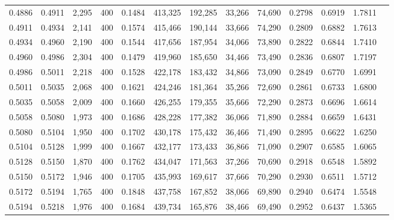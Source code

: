 \begin{tabular}{rrrrrrrrrrrrr}
0.4886 & 0.4911 &  2,295 & 400 &                                     0.1484 & 413,325 & 192,285 &  33,266 &  74,690 & 0.2798 & 0.6919 & 1.7811 \\
0.4911 & 0.4934 &  2,141 & 400 &                                     0.1574 & 415,466 & 190,144 &  33,666 &  74,290 & 0.2809 & 0.6882 & 1.7613 \\
0.4934 & 0.4960 &  2,190 & 400 &                                     0.1544 & 417,656 & 187,954 &  34,066 &  73,890 & 0.2822 & 0.6844 & 1.7410 \\
0.4960 & 0.4986 &  2,304 & 400 &                                     0.1479 & 419,960 & 185,650 &  34,466 &  73,490 & 0.2836 & 0.6807 & 1.7197 \\
0.4986 & 0.5011 &  2,218 & 400 &                                     0.1528 & 422,178 & 183,432 &  34,866 &  73,090 & 0.2849 & 0.6770 & 1.6991 \\
0.5011 & 0.5035 &  2,068 & 400 &                                     0.1621 & 424,246 & 181,364 &  35,266 &  72,690 & 0.2861 & 0.6733 & 1.6800 \\
0.5035 & 0.5058 &  2,009 & 400 &                                     0.1660 & 426,255 & 179,355 &  35,666 &  72,290 & 0.2873 & 0.6696 & 1.6614 \\
0.5058 & 0.5080 &  1,973 & 400 &                                     0.1686 & 428,228 & 177,382 &  36,066 &  71,890 & 0.2884 & 0.6659 & 1.6431 \\
0.5080 & 0.5104 &  1,950 & 400 &                                     0.1702 & 430,178 & 175,432 &  36,466 &  71,490 & 0.2895 & 0.6622 & 1.6250 \\
0.5104 & 0.5128 &  1,999 & 400 &                                     0.1667 & 432,177 & 173,433 &  36,866 &  71,090 & 0.2907 & 0.6585 & 1.6065 \\
0.5128 & 0.5150 &  1,870 & 400 &                                     0.1762 & 434,047 & 171,563 &  37,266 &  70,690 & 0.2918 & 0.6548 & 1.5892 \\
0.5150 & 0.5172 &  1,946 & 400 &                                     0.1705 & 435,993 & 169,617 &  37,666 &  70,290 & 0.2930 & 0.6511 & 1.5712 \\
0.5172 & 0.5194 &  1,765 & 400 &                                     0.1848 & 437,758 & 167,852 &  38,066 &  69,890 & 0.2940 & 0.6474 & 1.5548 \\
0.5194 & 0.5218 &  1,976 & 400 &                                     0.1684 & 439,734 & 165,876 &  38,466 &  69,490 & 0.2952 & 0.6437 & 1.5365 \\

\end{tabular}
